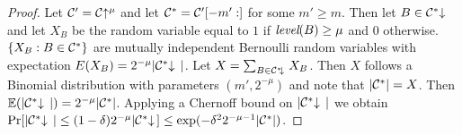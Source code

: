 \begin{proof}
Let $\mathcal{C}' = \mathcal{C}\negthickspace\uparrow^\mu$ and let $\mathcal{C}^* =
\mathcal{C}'[-m':]$ for some $m' \geq m$. Then let $B \in \mathcal{C}^*\negthickspace\downarrow\,$ and let
$X_B$ be the random variable equal to $1$ if $\emph{level}(B) \geq \mu$ and
$0$ otherwise. $\{ X_B: B \in \mathcal{C}^* \}$ are mutually independent Bernoulli
random variables with expectation $E(X_B) = 2^{-\mu}|\mathcal{C}^*\negthickspace\downarrow\,|$. Let
$X = \sum_{B \in \mathcal{C}^*\negthickspace\downarrow\,}{X_B}$. Then $X$ follows a Binomial
distribution with parameters $(m', 2^{-\mu})$ and note that $|\mathcal{C}^*| = X$.
Then $\mathbb{E}(|\mathcal{C}^*\negthickspace\downarrow\,|) = 2^{-\mu}|\mathcal{C}^*|$. Applying a Chernoff bound on
$|\mathcal{C}^*\negthickspace\downarrow\,|$ we obtain
$\Pr[|\mathcal{C}^*\negthickspace\downarrow\,| \leq (1 - \delta)2^{-\mu}|\mathcal{C}^*\negthickspace\downarrow\,] \leq
\exp(-\delta^2 2^{-\mu-1}|\mathcal{C}^*|)$.
\Qed
\end{proof}
